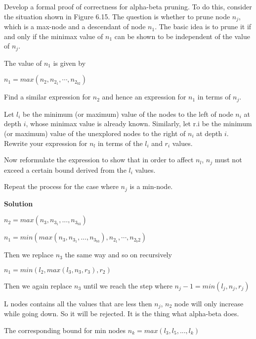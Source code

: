\documentclass[12pt]{article}
\theoremstyle{definiton}
\theoremstyle{definition}
\theoremstyle{definition}
\begin{document}
		Develop a formal proof of correctness for alpha-beta pruning. To do this, consider the situation shown in Figure 6.15. The question is whether to prune node $n_j$, which is a max-node and a descendant of node $n_1$. The basic idea is to prune it if and only if the minimax value of $n_1$ can be shown to be independent of the value of $n_j$.
\begin{list}{) ~}{}
\item The value of $n_1$ is given by 

$n_1=max(n_2, n_{2_{1}}, \cdots, n_{2_{b2}})$

Find a similar expression for $n_2$ and hence an expression for $n_1$ in terms of $n_j$.

\item Let $l_i$ be the minimum (or maximum) value of the nodes to the left of node $n_i$ at depth $i$, whose minimax value is already known. Similarly, let r.i be the minimum (or maximum) value of the unexplored nodes to the right of $n_i$ at depth $i$. Rewrite your expression for
$n_l$ in terms of the $l_i$ and $r_i$ values.

\item Now reformulate the expression to show that in order to affect $n_l$, $n_j$ must not exceed a certain bound derived from the $l_i$ values.

\item Repeat the process for the case where $n_j$ is a min-node.
\end{list}	
		\medskip
		
		\textbf{Solution}

\begin{list}{) ~}{}
\item  

$n_2 = max\left(n_3, n_{3_1}, ..., n_{3_{b3}}\right)$

$n_1 = min\left(max\left(n_3, n_{3_1}, ..., n_{3_{b3}}\right), n_{2_1}, \cdots, {n_{2_b2}}\right)$

Then we replace $n_3$ the same way and so on recursively

\item 

$n_1 = min\left(l_2, max\left(l_3, n_3, r_3\right), r_2\right)$

Then we again replace $n_3$ until we reach the step where $n_j-1 = min\left(l_j, n_j, r_j\right)$

\item 

L nodes contains all the values that are less then $n_j$, $n_2$ node will only increase while going down. So it will be rejected. It is the thing what alpha-beta does.

\item

 The corresponding bound for min nodes $n_k = max\left(l_3, l_5, ...,l_k\right)$
\end{list}		
\end{document}
